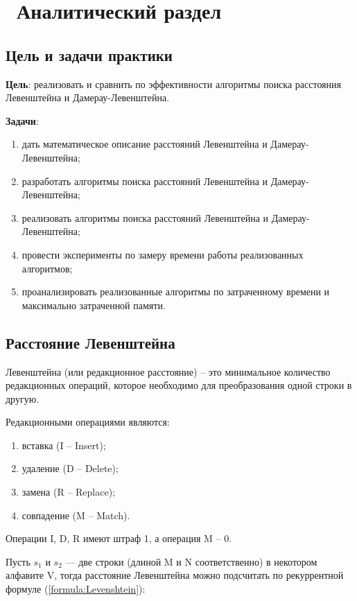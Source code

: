 \chapter{ Аналитический раздел}
\label{cha:analytical}
    \section{Цель и задачи практики}

    {\bf Цель}: реализовать и сравнить по эффективности алгоритмы поиска
    расстояния Левенштейна и Дамерау-Левенштейна.

    {\bf Задачи}:
    \begin{enumerate}
        \item дать математическое описание расстояний Левенштейна и Дамерау-Левенштейна;
        \item разработать алгоритмы поиска расстояний Левенштейна и Дамерау-Левенштейна;
        \item реализовать алгоритмы поиска расстояний Левенштейна и Дамерау-Левенштейна;
        \item провести эксперименты по замеру времени работы реализованных алгоритмов;
        \item проанализировать реализованные алгоритмы по затраченному времени и максимально затраченной памяти.
    \end{enumerate}

    \section{Расстояние Левенштейна}

    { Левенштейна} (или редакционное расстояние) -- это минимальное
    количество редакционных операций, которое необходимо для преобразования одной строки в другую.

    Редакционными операциями являются: \begin{enumerate}
        \item вставка (I -- Insert);
        \item удаление (D -- Delete);
        \item замена (R -- Replace);
        \item совпадение (M -- Match).
    \end{enumerate}
    
    Операции I, D, R имеют штраф 1, а операция M -- 0.

    Пусть $s_{1}$ и $s_{2}$ — две строки (длиной M и N соответственно) в некотором алфавите V,
    тогда расстояние Левенштейна можно подсчитать по рекуррентной формуле (\ref{formula:Levenshtein}):

